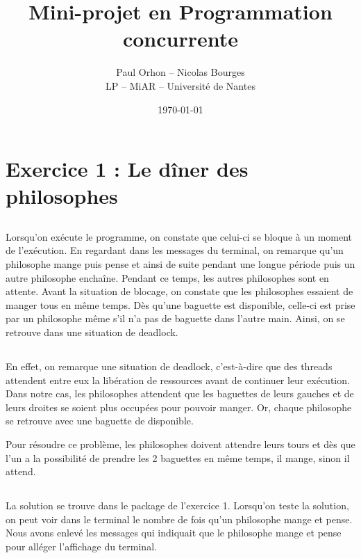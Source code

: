 \documentclass{article}
\title{Mini-projet en Programmation concurrente\\
    \normalsize }
\date{\today}
\author{Paul Orhon -- Nicolas Bourges\\
\small LP -- MiAR -- Université de Nantes }
\begin{document}
\maketitle%
\tableofcontents

\clearpage

\section{Exercice 1 : Le dîner des philosophes}
\subsection{}
Lorsqu’on exécute le programme, on constate que celui-ci se bloque à un moment de l’exécution. En regardant dans les messages du terminal, on remarque qu’un philosophe mange puis pense et ainsi de suite pendant une longue période puis un autre philosophe enchaîne. Pendant ce temps, les autres philosophes sont en attente. Avant la situation de blocage, on constate que les philosophes essaient de manger tous en même temps. Dès qu’une baguette est disponible, celle-ci est prise par un philosophe même s'il n’a pas de baguette dans l’autre main. Ainsi, on se retrouve dans une situation de deadlock.

\subsection{}
En effet, on remarque une situation de deadlock, c’est-à-dire que des threads attendent entre eux la libération de ressources avant de continuer leur exécution. Dans notre cas, les philosophes attendent que les baguettes de leurs gauches et de leurs droites se soient plus occupées pour pouvoir manger. Or, chaque philosophe se retrouve avec une baguette de disponible.

Pour résoudre ce problème, les philosophes doivent attendre leurs tours et dès que l’un a la possibilité de prendre les 2 baguettes en même temps, il mange, sinon il attend.

\subsection{}
La solution se trouve dans le package de l’exercice 1. Lorsqu’on teste la solution, on peut voir dans le terminal le nombre de fois qu’un philosophe mange et pense. Nous avons enlevé les messages qui indiquait que le philosophe mange et pense pour alléger l’affichage du terminal.
\end{document}
